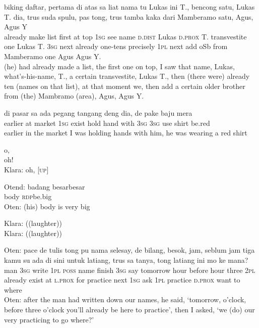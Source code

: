 \ea
{} {biking} {daftar,} {pertama} {di} {atas} {sa} {liat} {nama}  tu      Lukas {ini} {T.,} {bencong} {satu,} {Lukas} {T.} {dia,} {trus}          {suda} {spulu,} {pas} {tong,} {trus} {tamba} {kaka} {dari}  {Mamberamo} {satu,} {Agus,} {Agus} {Y}\\
{already} {make} {list} {first} {at} {top} {\textsc{1sg}} {see} {name}  \textsc{d.dist} Lukas {\textsc{d.prox}} {T.} {transvestite} {one} {Lukas} {T.} {\textsc{3sg}}  next {already} {one-tens} {precisely} {\textsc{1pl}} {next} {add} {oSb} from {Mamberamo} {one} {Agus} {Agus} {Y.} \\
\glt 
(he) had already made a list, the first one on top, I saw that name, Lukas, what’s-his-name, T., a certain transvestite, Lukas T., then (there were) already ten (names on that list), at that moment we, then add a certain older brother from (the) Mambramo (area), Agus, Agus Y.
\z


\ea
{}  di {pasar}  sa  ada  pegang  tangang  deng  dia, de {pake}  baju {mera}\\
{earlier}  at {market}  \textsc{1sg}  exist  hold  hand  with  \textsc{3sg}  \textsc{3sg} {use}  shirt {be.red}\\
\glt 
earlier in the market I was holding hands with him, he was wearing a red shirt
\z

\ea
{} o, {\upshape [\textsc{up}]}\\
{} oh!  \\
\glt 
Klara: oh, [\textsc{up}]
\z

\ea
\gll Otend: badang besar{\Tilde}besar\\
{} body \textsc{rdp}{\Tilde}be.big\\
\glt 
Oten: (his) body is very big
\z

\ea
\gll Klara: ((laughter))\\
Klara: ((laughter))\\
\z

\ea
\gll Oten: {pace} {de} {tulis} {tong} {pu} {nama} {selesay,} {de} {bilang,}                        {besok,} {jam,} {seblum} {jam} {tiga} {kamu} {su} {ada}  di                     {sini} {untuk} {latiang,} {trus} {sa} {tanya,} {tong} {latiang} {ini}                                        mo {ke} {mana}?\\
{} {man} {\textsc{3sg}} {write} {\textsc{1pl}} {\textsc{poss}} {name} {finish} {\textsc{3sg}} {say}  {tomorrow} {hour} {before} {hour} {three} {\textsc{2pl}} {already} {exist}  at  {\textsc{l.prox}} {for} {practice} {next} {\textsc{1sg}} {ask} {\textsc{1pl}} {practice} {\textsc{d.prox}}   want {to} {where}\\    
\glt 
Oten: after the man had written down our names, he said, ‘tomorrow, o’clock, before three o’clock you’ll already be here to practice’, then I asked, ‘we (do) our very practicing to go where?’
\z

